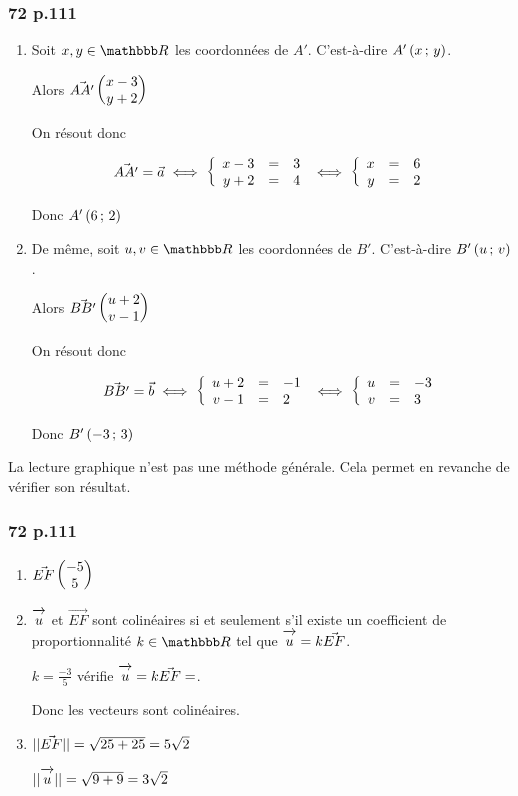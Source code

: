 \documentclass[10pt,a4paper,openany,twoside, prof]{book}
\begin{document}
\subsubsection*{72 p.111}
\begin{enumerate}[label=(\roman*)]
\item
Soit $x,y \in\R$ les coordonnées de $A'$. C'est-à-dire $A'\left(x\,;\,y\right)$.

Alors $\vec{AA'}\begin{pmatrix}x-3\\y+2\end{pmatrix}$

On résout donc

\begin{align*}
    \vec{AA'} =\vec{a} \iff \left\{\begin{array}{rcl} x-3 &=& 3 \\ y+2 &=& 4 \end{array}\right. \iff \left\{\begin{array}{rcl} x &=& 6 \\ y &=& 2 \end{array}\right.
\end{align*}

Donc $A'\left(6\,;\,2\right)$

\item
De même, soit $u,v \in\R$ les coordonnées de $B'$. C'est-à-dire $B'\left(u\,;\,v\right)$.

Alors $\vec{BB'}\begin{pmatrix}u+2\\v-1\end{pmatrix}$

On résout donc

\begin{align*}
    \vec{BB'} =\vec{b} \iff \left\{\begin{array}{rcl} u+2 &=& -1 \\ v-1 &=& 2 \end{array}\right. \iff \left\{\begin{array}{rcl} u &=& -3 \\ v &=& 3 \end{array}\right.
\end{align*}

Donc $B'\left(-3\,;\,3\right)$

\end{enumerate}

\begin{rem}{}{}
    La lecture graphique n'est pas une méthode générale. Cela permet en revanche de vérifier son résultat.
\end{rem}

\subsubsection*{72 p.111}
\begin{enumerate}[label=(\alph*)]
    \item $\vec{EF}\begin{pmatrix}-5\\5\end{pmatrix}$
    \item $\overrightarrow{\,\mathstrut u\,}$ et $\vec{EF}$ sont colinéaires si et seulement s'il existe un coefficient de proportionnalité $k\in\R$ tel que $\overrightarrow{\,\mathstrut u\,}=k\vec{EF}$.

    $k=\frac{-3}{5}$ vérifie  $\overrightarrow{\,\mathstrut u\,}=k\vec{EF}=$.

    Donc les vecteurs sont colinéaires.

    \item
    $||\vec{EF}|| = \sqrt{25+25} = 5\sqrt{2}$

    $||\overrightarrow{\,\mathstrut u\,}|| = \sqrt{9+9} = 3\sqrt{2}$
\end{enumerate}
\end{document}
